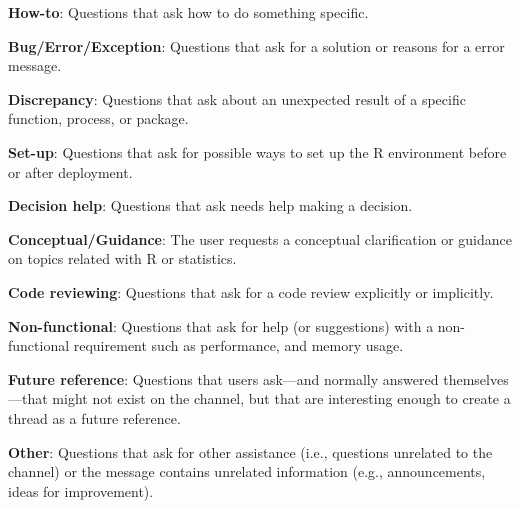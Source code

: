 \documentclass{sig-alternate-05-2015}
\begin{document}
	\begin{packed_enum}
	\item \textbf{How-to}: Questions that ask how to do something specific.
	\item \textbf{Bug/Error/Exception}: Questions that ask for a solution or reasons for a error message.
	\item \textbf{Discrepancy}: Questions that ask about an unexpected result of a specific function, process, or package.
	\item \textbf{Set-up}: Questions that ask for possible ways to set up the R environment before or after deployment.
	\item \textbf{Decision help}: Questions that ask needs help making a decision.
	\item \textbf{Conceptual/Guidance}: The user requests a conceptual clarification or guidance on topics related with R or statistics.
	\item \textbf{Code reviewing}: Questions that ask for a code review explicitly or implicitly.
	\item \textbf{Non-functional}: Questions that ask for help (or suggestions) with a non-functional requirement such as performance, and memory usage.
	\item \textbf{Future reference}: Questions that users ask---and normally answered themselves---that might not exist on the channel, but that are interesting enough to create a thread as a future reference.
	\item \textbf{Other}: Questions that ask for other assistance (i.e., questions unrelated to the channel) or the message contains unrelated information (e.g., announcements, ideas for improvement).
	\end{packed_enum}


\end{document}
